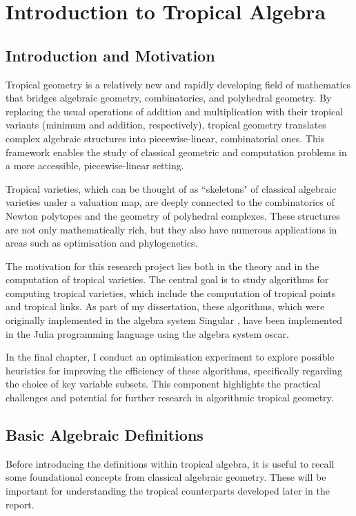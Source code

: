 \documentclass[11pt,reqno,a4paper]{article}
\theoremstyle{theoremstyle}
\theoremstyle{examplestyle}
\theoremstyle{algorithmstyle}
\numberwithin{equation}{subsection}
\begin{document}
\section{Introduction to Tropical Algebra}
\subsection{Introduction and Motivation}
Tropical geometry is a relatively new and rapidly developing field of mathematics that bridges algebraic geometry, combinatorics, and polyhedral geometry. By replacing the usual operations of addition and multiplication with their tropical variants (minimum and addition, respectively), tropical geometry translates complex algebraic structures into piecewise-linear, combinatorial ones. This framework enables the study of classical geometric and computation problems in a more accessible, piecewise-linear setting.

Tropical varieties, which can be thought of as ``skeletons" of classical algebraic varieties under a valuation map, are deeply connected to the combinatorics of Newton polytopes and the geometry of polyhedral complexes. These structures are not only mathematically rich, but they also have numerous applications in areas such as optimisation and phylogenetics.

The motivation for this research project lies both in the theory and in the computation of tropical varieties. The central goal is to study algorithms for computing tropical varieties, which include the computation of tropical points and tropical links. As part of my dissertation, these algorithms, which were originally implemented in the algebra system {\sc Singular} \cite{DGPS}, have been implemented in the Julia programming language  \cite{julialang} using the algebra system {\sc oscar}.

In the final chapter, I conduct an optimisation experiment to explore possible heuristics for improving the efficiency of these algorithms, specifically regarding the choice of key variable subsets. This component highlights the practical challenges and potential for further research in algorithmic tropical geometry. 


\subsection{Basic Algebraic Definitions}
Before introducing the definitions within tropical algebra, it is useful to recall some foundational concepts from classical algebraic geometry. These will be important for understanding the tropical counterparts developed later in the report. 
\end{document}
